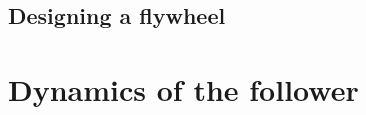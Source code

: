 \documentclass[a4paper]{article}
\begin{document}
\subsection{Designing a flywheel}

\section{Dynamics of the follower}



\end{document}
